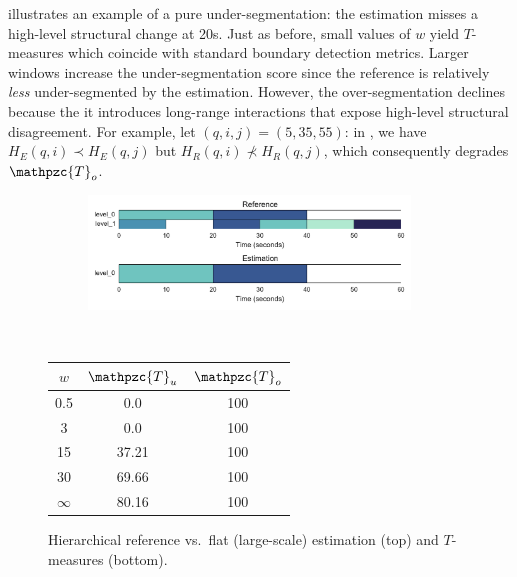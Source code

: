 \documentclass{article}
\def\shag{\ensuremath{\mathpzc{T}}}
\begin{document}
 illustrates an example of a pure under-segmentation: the estimation misses a high-level structural change at 20s.  
Just as before, small values of $w$ yield $T$-measures which coincide with standard boundary detection metrics.
Larger windows increase the under-segmentation score since the reference is relatively \emph{less} under-segmented by the estimation.
However, the over-segmentation declines because the it introduces long-range interactions that expose high-level structural disagreement.
For example, let $(q, i, j) = (5, 35, 55)$: in , we have $H_E(q, i) \prec H_E(q, j)$ but $H_R(q, i) \nprec H_R(q, j)$, which consequently degrades $\shag_o$.


\begin{figure}
  \centering
  \begin{subfigure}{0.5\textwidth}
    \centering
    \includegraphics[width=0.94\textwidth]{figs/hier-flatlarge.pdf}
  \end{subfigure}%
  \\
  \begin{minipage}{0.5\textwidth}
    \centering
    \vspace{10pt}
    \begin{tabular}{|c|c|c|}
      \hline
      $w$       & $\shag_u$    & $\shag_o$      \\
      \hline
      0.5       & 0.0      & 100      \\     
      3         & 0.0      & 100      \\
      15        & 37.21     & 100    \\
      30        & 69.66     & 100    \\
      $\infty$  & 80.16     & 100    \\
      \hline
    \end{tabular}
  \end{minipage}
  \caption{Hierarchical reference vs.\ flat (large-scale) estimation (top) and $T$-measures (bottom).}
  \label{fig:hier-flatlarge}
\end{figure}
\end{document}
